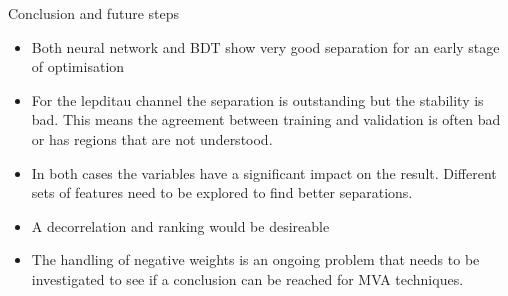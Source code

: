 \begin{frame}{Conclusion and future steps}
    \begin{itemize}
        \item Both neural network and BDT show very good separation for an early stage of optimisation
        \vspace{0.2cm}
        \item For the lepditau channel the separation is outstanding but the stability is bad. This means the agreement between training and validation is often bad
        or has regions that are not understood.
        \vspace{0.2cm}
        \item In both cases the variables have a significant impact on the result. Different sets of features need to be explored to find better separations.
        \vspace{0.2cm}
        \item A decorrelation and ranking would be desireable
        \vspace{0.2cm}
        \item The handling of negative weights is an ongoing problem that needs to be investigated to see if a conclusion can be reached for MVA techniques.
    \end{itemize}
\end{frame}

